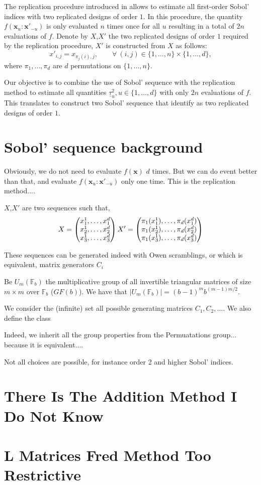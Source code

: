 \documentclass[]{elsarticle}
\theoremstyle{definition}
\newcommand{\bvec}[1]{\boldsymbol{#1}}
\newcommand{\vx}{\bvec{x}}
\def\abs#1{\ensuremath{\left \lvert #1 \right \rvert}}
\begin{document}
The replication procedure introduced in \cite{} allows to estimate all first-order Sobol' indices with two replicated designs of order $1$. In this procedure, the quantity $f(\vx_u:{\vx'}_{-u})$ is only evaluated $n$ times once for all $u$ resulting in a total of $2n$ evaluations of $f$. Denote by $X$,$X'$ the two replicated designs of order $1$ required by the replication procedure, $X'$ is constructed from $X$ as follows:
\[{x'}_{i,j}=x_{\pi_j(i),j}, \qquad \forall \ (i,j) \in \{1,\dots,n\} \times \{1,\dots,d\},\]
where $\pi_1,\dots,\pi_d$ are $d$ permutations on $\{1,\dots,n\}$.
\bigskip

Our objective is to combine the use of Sobol' sequence with the replication method to estimate all quantities $\underline{\tau}_u^2, u \in \{1,\dots,d\}$ with only $2n$ evaluations of $f$. This translates to construct two Sobol' sequence that identify as two replicated designs of order $1$. 


\section{Sobol' sequence background}
Obviously, we do not need to evaluate $f(\vx)$ $d$ times. But we can do event better than that, and evaluate $f(\vx_u:{\vx'}_{-u})$ only one time. This is the replication method....

$X$,$X'$ are two sequences such that,
\[
X = \begin{pmatrix}
x_1^1,\dots,x_1^d \\
x_2^1,\dots,x_2^d \\
x_3^1,\dots,x_3^d \\
\end{pmatrix} \\
X' = \begin{pmatrix}
\pi_1(x_1^1),\dots,\pi_d(x_1^d) \\
\pi_1(x_2^1),\dots,\pi_d(x_2^d) \\
\pi_1(x_3^1),\dots,\pi_d(x_3^d) \\
\end{pmatrix}
\]

These sequences can be generated indeed with Owen scramblings, or which is equivalent, matrix generators $C_i$

Be $U_m(\mathbb{F}_b)$ the multiplicative group of all invertible triangular matrices of size $m\times m$ over $\mathbb{F}_b$ ($GF(b)$). We have that $\abs{U_m(\mathbb{F}_b)}=(b-1)^m b^{(m-1)m/2}$.

We consider the (infinite) set all possible generating matrices $C_1,C_2,\dots$. We also define the class 

Indeed, we inherit all the group properties from the Permuatations group... because it is equivalent....

Not all choices are possible, for instance order 2 and higher Sobol' indices.


\section{There Is The Addition Method I Do Not Know}

\section{L Matrices Fred Method Too Restrictive}
\end{document}
